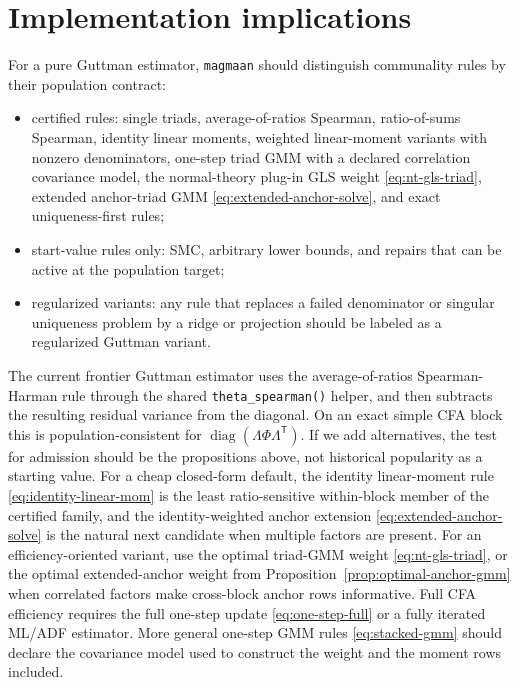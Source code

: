 \documentclass[11pt]{article}
\newcommand{\T}{^{\mathsf T}}
\newcommand{\diag}{\operatorname{diag}}
\theoremstyle{plain}
\theoremstyle{remark}
\begin{document}
\section{Implementation implications}

For a pure Guttman estimator, \texttt{magmaan} should distinguish
communality rules by their population contract:
\begin{itemize}
\item certified rules: single triads, average-of-ratios Spearman, ratio-of-sums
  Spearman, identity linear moments, weighted linear-moment variants with
  nonzero denominators, one-step triad GMM with a declared correlation
  covariance model, the normal-theory plug-in GLS weight
  \eqref{eq:nt-gls-triad}, extended anchor-triad GMM
  \eqref{eq:extended-anchor-solve}, and exact uniqueness-first rules;
\item start-value rules only: SMC, arbitrary lower bounds, and repairs that can
  be active at the population target;
\item regularized variants: any rule that replaces a failed denominator or
  singular uniqueness problem by a ridge or projection should be labeled as a
  regularized Guttman variant.
\end{itemize}

The current frontier Guttman estimator uses the average-of-ratios
Spearman-Harman rule through the shared \texttt{theta\_spearman()} helper, and
then subtracts the resulting residual variance from the diagonal. On an exact
simple CFA block this is population-consistent for
\(\diag(\Lambda\Phi\Lambda\T)\). If we add alternatives, the test for admission
should be the propositions above, not historical popularity as a starting value.
For a cheap closed-form default, the identity linear-moment rule
\eqref{eq:identity-linear-mom} is the least ratio-sensitive within-block member
of the certified family, and the identity-weighted anchor extension
\eqref{eq:extended-anchor-solve} is the natural next candidate when multiple
factors are present. For an efficiency-oriented variant, use the optimal
triad-GMM weight \eqref{eq:nt-gls-triad}, or the optimal extended-anchor weight
from Proposition~\ref{prop:optimal-anchor-gmm} when correlated factors make
cross-block anchor rows informative. Full CFA efficiency requires the full
one-step update \eqref{eq:one-step-full} or a fully iterated ML/ADF estimator.
More general one-step GMM rules \eqref{eq:stacked-gmm} should declare the
covariance model used to construct the weight and the moment rows included.
\end{document}
